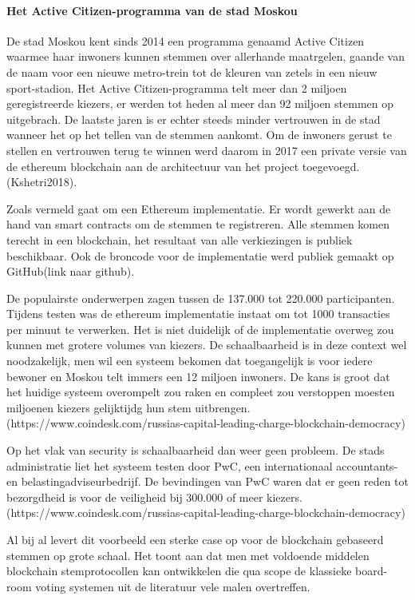 				\paragraph{Het Active Citizen-programma van de stad Moskou}
				De stad Moskou kent sinds 2014 een programma genaamd Active Citizen waarmee haar inwoners  kunnen stemmen over allerhande maatrgelen, gaande van de naam voor een nieuwe metro-trein tot de kleuren van zetels in een nieuw sport-stadion. Het Active Citizen-programma telt meer dan 2 miljoen geregistreerde kiezers, er werden tot heden al meer dan 92 miljoen stemmen op uitgebrach. De laatste jaren is er echter steeds minder vertrouwen in de stad wanneer het op het tellen van de stemmen aankomt. Om de inwoners gerust te stellen en vertrouwen terug te winnen werd  daarom in 2017 een private versie van de ethereum blockchain aan de architectuur van het project toegevoegd. (Kshetri2018).
				
				Zoals vermeld gaat om een Ethereum implementatie. Er wordt gewerkt aan de hand van smart contracts om de stemmen te registreren. Alle stemmen komen terecht in een  blockchain, het resultaat van alle verkiezingen is publiek beschikbaar. Ook de  broncode voor de implementatie werd publiek gemaakt op GitHub(link naar github).
				
				De populairste onderwerpen zagen tussen de 137.000 tot 220.000 participanten. Tijdens testen was de  ethereum implementatie  instaat om tot 1000 transacties per minuut te verwerken. Het is niet duidelijk of de implementatie overweg zou kunnen met  grotere volumes van kiezers. De schaalbaarheid is in deze context wel noodzakelijk, men wil een systeem bekomen dat toegangelijk is voor iedere bewoner en Moskou telt immers een 12 miljoen inwoners. De kans is groot dat het huidige systeem overompelt zou raken en compleet zou verstoppen moesten miljoenen kiezers gelijktijdg hun stem uitbrengen.(https://www.coindesk.com/russias-capital-leading-charge-blockchain-democracy)
				
				Op het vlak van security is schaalbaarheid dan weer geen probleem. De stads administratie liet het systeem testen door PwC, een internationaal accountants- en belastingadviseurbedrijf. De bevindingen van PwC waren dat er geen reden tot bezorgdheid is voor de veiligheid bij  300.000 of meer kiezers. (https://www.coindesk.com/russias-capital-leading-charge-blockchain-democracy)
				
				Al bij al levert dit voorbeeld een sterke case op voor de blockchain gebaseerd stemmen op grote schaal. Het toont aan dat men met voldoende middelen blockchain stemprotocollen kan ontwikkelen die qua scope de klassieke board-room voting systemen uit de literatuur vele malen overtreffen. 
